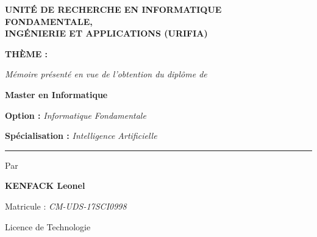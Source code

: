 \begin{titlepage}
\vspace{1.4em}

{\small \textbf{UNITÉ DE RECHERCHE EN INFORMATIQUE FONDAMENTALE,\\
INGÉNIERIE ET APPLICATIONS (URIFIA)} \par}

\vspace{1.5em}

{\small \textbf{THÈME :} \par}

\vspace{0.5em}


\vspace{1.1em}

{\small \textit{Mémoire présenté en vue de l'obtention du diplôme de} \par}
\vspace{0.2em}
{\large \textbf{Master en Informatique} \par}
\vspace{0.3em}
{\small \textbf{Option :} \textcolor{uridarkblue}{\textit{Informatique Fondamentale}} \par}
{\small \textbf{Spécialisation :} \textcolor{uridarkblue}{\textit{Intelligence Artificielle}} \par}

\vspace{1em}

\rule{0.55\linewidth}{0.4pt}

\vspace{0.7em}

{\small Par \par}
\vspace{0.3em}
{\Large\bfseries \textcolor{uridarkblue}{KENFACK Leonel} \par}
\vspace{0.1em}
{\footnotesize Matricule : \textit{CM-UDS-17SCI0998} \par}
{\footnotesize Licence de Technologie \par}


\end{titlepage}
